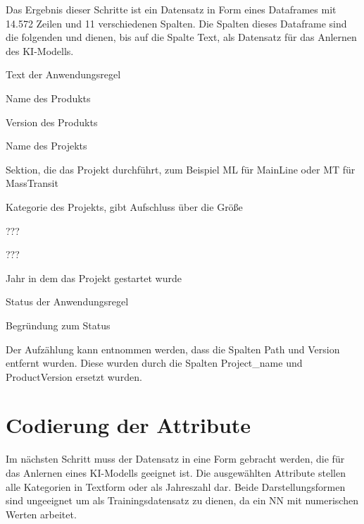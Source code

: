 Das Ergebnis dieser Schritte ist ein Datensatz in Form eines Dataframes mit 14.572 Zeilen und 11 verschiedenen Spalten. Die Spalten dieses Dataframe sind die folgenden und dienen, bis auf die 
Spalte \glqq Text\grqq{}, als Datensatz für das Anlernen des \ac{KI}-Modells.
\begin{description}[style=multiline,leftmargin=3cm,font=\bfseries, nolistsep]
    \item[Text] Text der Anwendungsregel
    \item[Product] Name des Produkts
    \item[ProductVersion] Version des Produkts
    \item[Project_name] Name des Projekts
    \item[section] Sektion, die das Projekt durchführt, zum Beispiel ML für MainLine oder MT für MassTransit
    \item[Project_category] Kategorie des Projekts, gibt Aufschluss über die Größe
    \item[BS] ???
    \item[RU] ???
    \item[ProjectYear] Jahr in dem das Projekt gestartet wurde
    \item[Status] Status der Anwendungsregel
    \item[Statement] Begründung zum Status
\end{description} 
Der Aufzählung kann entnommen werden, dass die Spalten \glqq Path\grqq{} und \glqq Version\grqq{} entfernt wurden. Diese wurden durch die Spalten \glqq Project_name\grqq{} und 
\glqq ProductVersion\grqq{} ersetzt wurden.

\section{Codierung der Attribute}
Im nächsten Schritt muss der Datensatz in eine Form gebracht werden, die für das Anlernen eines \ac{KI}-Modells geeignet ist. Die ausgewählten Attribute stellen alle Kategorien in 
Textform oder als Jahreszahl dar. Beide Darstellungsformen sind ungeeignet um als Trainingsdatensatz zu dienen, da ein \ac{NN} mit numerischen Werten arbeitet.